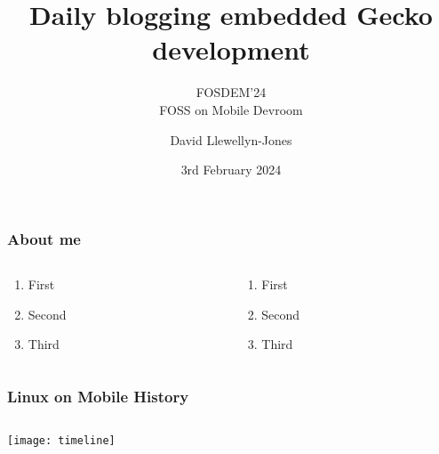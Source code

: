 \documentclass[
	notes=none,
	aspectratio=169
]{beamer}
\begin{document}
\title{Daily blogging embedded Gecko development}
\subtitle{FOSDEM'24\\FOSS on Mobile Devroom}
\author{David Llewellyn-Jones}
\date{3rd February 2024}


\renewcommand{\thefootnote}{\arabic{footnote}}

\frame{
\titlepage
}
\note{
}

\renewcommand{\thefootnote}{\fnsymbol{footnote}}


\begin{frame}
\frametitle{About me}

\begin{columns}[T]
\begin{column}[T]{0.5\textwidth}
\setlength{\parskip}{0.5em}

\vspace{1.5cm}
\begin{enumerate}
\setlength{\parskip}{0.5em}
\item First
\item Second
\item Third
\end{enumerate}

\end{column}
\begin{column}[T]{0.5\textwidth}
\setlength{\parskip}{0.5em}

\vspace{1.5cm}
\begin{enumerate}
\setlength{\parskip}{0.5em}
\item First
\item Second
\item Third
\end{enumerate}

\end{column}
\end{columns}

\end{frame}
\note{
}


\begin{frame}
\frametitle{Linux on Mobile History}

\begin{columns}[T]
\begin{column}[T]{1.1\textwidth}

\vspace{0.5cm}
\texttt{[image: timeline]}

\end{column}
\end{columns}

\end{frame}
\note{
}
\end{document}
